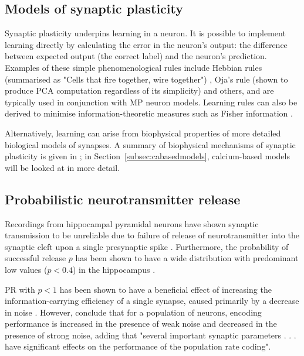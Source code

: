 \documentclass[a4paper,12pt]{report}
\theoremstyle{definition}
\begin{document}
\subsection{Models of synaptic plasticity}
\label{subsec:modelsofplasticity}

Synaptic plasticity underpins learning in a neuron. It is possible to implement learning directly by calculating the error in the neuron's output: the difference between expected output (the correct label) and the neuron's prediction. Examples of these simple phenomenological rules include Hebbian rules (summarised as "Cells that fire together, wire together") \cite{hebb1952organisation}, Oja's rule (shown to produce PCA computation regardless of its simplicity) \cite{oja2008oja} and others, and are typically used in conjunction with MP neuron models. Learning rules can also be derived to minimise information-theoretic measures such as Fisher information \cite{echeveste2014generating}.

Alternatively, learning can arise from biophysical properties of more detailed biological models of synapses. A summary of biophysical mechanisms of synaptic plasticity is given in \cite{shouval2007models}; in Section~\ref{subsec:cabasedmodels}, calcium-based models will be looked at in more detail.


\subsection{Probabilistic neurotransmitter release}

Recordings from hippocampal pyramidal neurons have shown synaptic transmission to be unreliable due to failure of release of neurotransmitter into the synaptic cleft upon a single presynaptic spike \cite{stevens1995facilitation}. Furthermore, the probability of successful release $p$ has been shown to have a wide distribution with predominant low values ($p < 0.4$) in the hippocampus \cite{murthy1997heterogeneous}.

PR with $p<1$ has been shown to have a beneficial effect of increasing the information-carrying efficiency of a single synapse, caused primarily by a decrease in noise \cite{goldman2004enhancement}. However, \cite{guo2012population} conclude that for a population of neurons, encoding performance is increased in the presence of weak noise and decreased in the presence of strong noise, adding that "several important synaptic parameters . . . have significant effects on the performance of the population rate coding".
\end{document}
